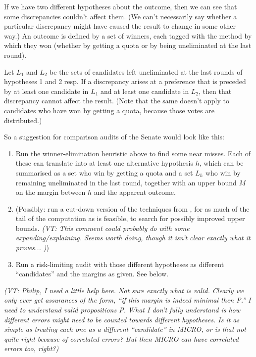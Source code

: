 \documentclass[10pt,a4paper]{article}
\newcommand{\VTNote}[1]{{\it(VT: #1)}}
\begin{document}
If we have two different hypotheses about the outcome, then we can see that some discrepancies couldn't affect them.  (We can't necessarily say whether a particular discrepancy might have caused the result to change in some other way.)  An outcome is defined by a set of winners, each tagged with the method by which they won (whether by getting a quota or by being uneliminated at the last round).

Let $L_1$ and $L_2$ be the sets of candidates left uneliminated at the last rounds of hypotheses 1 and 2 resp.  If a discrepancy arises at a preference that is preceded by at least one candidate in $L_1$ and at least one candidate in $L_2$, then that discrepancy cannot affect the result.  (Note that the same doesn't apply to candidates who have won by getting a quota, because those votes are distributed.)

So a suggestion for comparison audits of the Senate would look like this:
\begin{enumerate}
\item Run the winner-elimination heuristic above to find some near misses.  Each of these can translate into at least one alternative hypothesis $h$, which can be summarised as a set who win by getting a quota and a set $L_h$ who win by remaining uneliminated in the last round, together with an upper bound $M$ on the margin between $h$ and the apparent outcome.
\item (Possibly: run a cut-down version of the techniques from \cite{blom2015efficient}, for as much of the tail of the computation as is feasible, to search for possibly improved upper bounds.  \VTNote{This comment could probably do with some expanding/explaining.  Seems worth doing, though it isn't clear exactly what it proves...  })
\item Run a risk-limiting audit with those different hypotheses as different ``candidates'' and the margins as given.  See below. 
\end{enumerate}

\VTNote{Philip, I need a little help here.  Not sure exactly what is valid.  Clearly we only ever get assurances of the form, ``if this margin is indeed minimal then P.''  I need to understand valid propositions P.   What I don't fully understand is how different errors might need to be counted towards different hypotheses.  Is it as simple as treating each one as a different ``candidate'' in MICRO, or is that not quite right because of correlated errors?  But then MICRO can have correlated errors too, right?}
\end{document}
